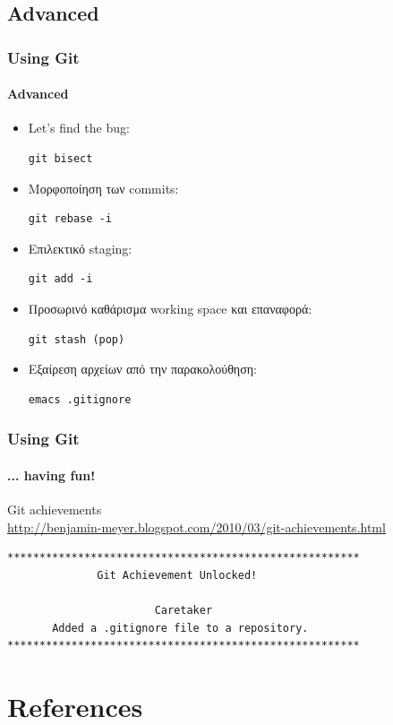 \documentclass[handout]{beamer}
\begin{document}
\subsection{Advanced}

\begin{frame}[fragile]
  \frametitle{Using Git}
  \framesubtitle{Advanced}
  \begin{itemize}
    \item Let's find the bug:
\begin{verbatim}
git bisect
\end{verbatim}\pause
    \item Μορφοποίηση των commits:
\begin{verbatim}
git rebase -i
\end{verbatim}\pause
    \item Επιλεκτικό staging:
\begin{verbatim}
git add -i
\end{verbatim}\pause
    \item Προσωρινό καθάρισμα working space και επαναφορά:
\begin{verbatim}
git stash (pop)
\end{verbatim}\pause
    \item Εξαίρεση αρχείων από την παρακολούθηση:
\begin{verbatim}
emacs .gitignore
\end{verbatim}
  \end{itemize}
\end{frame}

\begin{frame}[fragile]
  \frametitle{Using Git}
  \framesubtitle{... having fun!}
  \begin{center}
  Git achievements \\
  \url{http://benjamin-meyer.blogspot.com/2010/03/git-achievements.html}
\begin{verbatim}
*******************************************************
              Git Achievement Unlocked!

                       Caretaker
       Added a .gitignore file to a repository.
*******************************************************
\end{verbatim}
  \end{center}
\end{frame}

\section*{References}
\end{document}
